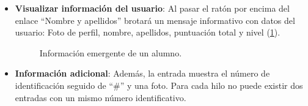 \documentclass[a4paper, 12pt]{book}
\begin{document}
\begin{itemize}
  Si se presiona sobre el enlace del t\'itulo, se abrir\'a otra pesta\~na con la ubicaci\'on de la propia entrada dentro del blog.
  \item {\bfseries Visualizar informaci\'on del usuario}: Al pasar el rat\'on por encima del enlace ``Nombre y apellidos'' brotar\'a un mensaje informativo 
  con datos del usuario: Foto de perfil, nombre, apellidos, puntuaci\'on total y nivel (\ref{figura:hiloalumno2}).
  \begin{figure}[htbp] 
    \centering
    \caption{Informaci\'on emergente de un alumno.}
    \label{figura:hiloalumno2}
  \end{figure}
  
  \item {\bfseries Informaci\'on adicional}: Adem\'as, la entrada muestra el n\'umero de identificaci\'on seguido de ``\#'' y una foto. Para cada hilo no puede existir
  dos entradas con un mismo n\'umero identificativo.
\end{itemize}
\end{document}
